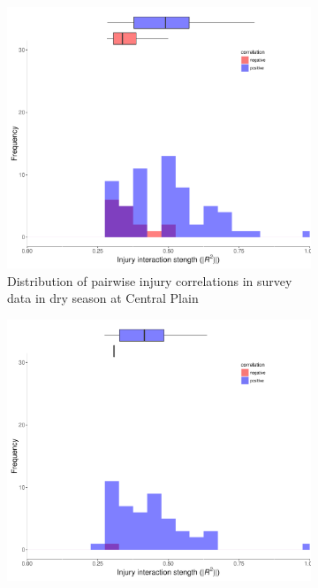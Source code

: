 \begin{figure}
   \begin{subfigure}[b]{0.5\textwidth}
        \includegraphics[width = \textwidth]{figures/combinedplotCP_ds.pdf}
        \caption{Distribution of pairwise injury correlations in survey data in dry season at Central Plain}
        \label{fig:cortest1}
    \end{subfigure}
    \begin{subfigure}[b]{0.5\textwidth}
        \includegraphics[width = \textwidth]{figures/combinedplotCP_ws.pdf}

\end{subfigure}
\end{figure}

